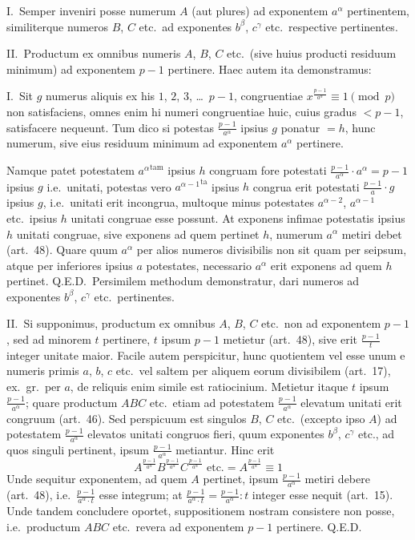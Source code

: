 \documentclass[12pt,a4paper]{article}
\theoremstyle{plain}
\theoremstyle{definition}
\theoremstyle{remark}
\begin{document}
I.\ Semper inveniri posse numerum $A$ (aut plures) ad exponentem $a^\alpha$ pertinentem, similiterque numeros $B$, $C$ etc.\ ad exponentes $b^\beta$, $c^\gamma$ etc.\ respective pertinentes.

II.\ Productum ex omnibus numeris $A$, $B$, $C$ etc.\ (sive huius producti residuum minimum) ad exponentem $p-1$ pertinere. Haec autem ita demonstramus:

I.\ Sit $g$ numerus aliquis ex his $1$, $2$, $3$, \dots\ $p-1$, congruentiae $x^{\frac{p-1}{a^\alpha}} \equiv 1 \pmod{p}$ non satisfaciens, omnes enim hi numeri congruentiae huic, cuius gradus $< p-1$, satisfacere nequeunt. Tum dico si potestas $\frac{p-1}{a^\alpha}$ ipsius $g$ ponatur $= h$, hunc numerum, sive eius residuum minimum ad exponentem $a^\alpha$ pertinere.

Namque patet potestatem ${a^\alpha}^\text{tam}$ ipsius $h$ congruam fore potestati $\frac{p-1}{a^\alpha} \cdot a^\alpha = p-1$ ipsius $g$ i.e.\ unitati, potestas vero ${a^{\alpha-1}}^\text{ta}$ ipsius $h$ congrua erit potestati $\frac{p-1}{a} \cdot g$ ipsius $g$, i.e.\ unitati erit incongrua, multoque minus potestates $a^{\alpha-2}$, $a^{\alpha-1}$ etc.\ ipsius $h$ unitati congruae esse possunt. At exponens infimae potestatis ipsius $h$ unitati congruae, sive exponens ad quem pertinet $h$, numerum $a^\alpha$ metiri debet (art.~48). Quare quum $a^\alpha$ per alios numeros divisibilis non sit quam per seipsum, atque per inferiores ipsius $a$ potestates, necessario $a^\alpha$ erit exponens ad quem $h$ pertinet. Q.E.D.\ Persimilem methodum demonstratur, dari numeros ad exponentes $b^\beta$, $c^\gamma$ etc.\ pertinentes.

II.\ Si supponimus, productum ex omnibus $A$, $B$, $C$ etc.\ non ad exponentem $p-1$, sed ad minorem $t$ pertinere, $t$ ipsum $p-1$ metietur (art.~48), sive erit $\frac{p-1}{t}$ integer unitate maior. Facile autem perspicitur, hunc quotientem vel esse unum e numeris primis $a$, $b$, $c$ etc.\ vel saltem per aliquem eorum divisibilem (art.~17), ex.\ gr.\ per $a$, de reliquis enim simile est ratiocinium. Metietur itaque $t$ ipsum $\frac{p-1}{a^\alpha}$; quare productum $ABC$ etc.\ etiam ad potestatem $\frac{p-1}{a^\alpha}$ elevatum unitati erit congruum (art.~46). Sed perspicuum est singulos $B$, $C$ etc.\ (excepto ipso $A$) ad potestatem $\frac{p-1}{a^\alpha}$ elevatos unitati congruos fieri, quum exponentes $b^\beta$, $c^\gamma$ etc., ad quos singuli pertinent, ipsum $\frac{p-1}{a^\alpha}$ metiantur. Hinc erit
\[
A^{\frac{p-1}{a^\alpha}} B^{\frac{p-1}{a^\alpha}} C^{\frac{p-1}{a^\alpha}} \text{ etc.} = A^{\frac{p-1}{a^\alpha}} \equiv 1
\]
Unde sequitur exponentem, ad quem $A$ pertinet, ipsum $\frac{p-1}{a^\alpha}$ metiri debere (art.~48), i.e.\ $\frac{p-1}{a^\alpha \cdot t}$ esse integrum; at $\frac{p-1}{a^\alpha \cdot t} = \frac{p-1}{a^\alpha} : t$ integer esse nequit (art.~15). Unde tandem concludere oportet, suppositionem nostram consistere non posse, i.e.\ productum $ABC$ etc.\ revera ad exponentem $p-1$ pertinere. Q.E.D.
\end{document}
